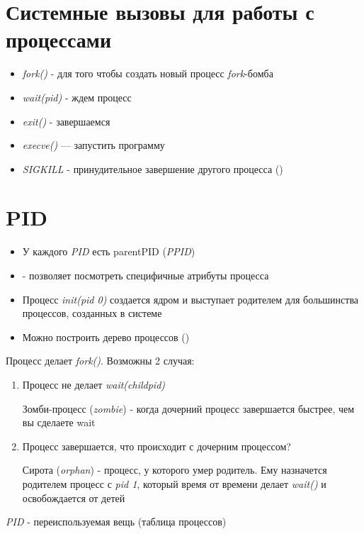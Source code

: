 \documentclass[../lectures.tex]{subfiles}
\begin{document}
\section{Системные вызовы для работы с процессами}
\begin{itemize}
    \item \emph{fork()} - для того чтобы создать новый процесс
    \emph{fork}-бомба
    \item \emph{wait(pid)} - ждем процесс
    \item \emph{exit()} - завершаемся
    \item \emph{execve()} --- запустить программу
    \item \emph{SIGKILL} - принудительное завершение другого процесса ()
\end{itemize}

\section{PID}
\begin{itemize}
    \item У каждого \emph{PID} есть parentPID (\emph{PPID})

    \item {} - позволяет посмотреть специфичные атрибуты процесса

    \item Процесс \emph{init(pid 0)} создается ядром и выступает родителем для большинства процессов, созданных в системе

    \item Можно построить дерево процессов ()
\end{itemize}

Процесс делает \emph{fork()}. Возможны 2 случая:
\begin{enumerate}
    \item 
        Процесс не делает \emph{wait(childpid)}

        Зомби-процесс (\emph{zombie}) - когда дочерний процесс завершается быстрее, чем вы сделаете wait
    \item 
        Процесс завершается, что происходит с дочерним процессом?

        Сирота (\emph{orphan}) - процесс, у которого умер родитель. 
        Ему назначется родителем процесс с \emph{pid 1}, который время от времени делает \emph{wait()} и освобождается от детей
\end{enumerate}
\emph{PID} - переиспользуемая вещь (таблица процессов)
\end{document}
